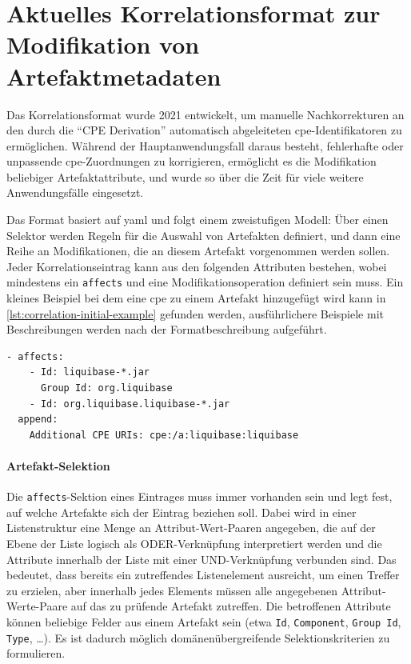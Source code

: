 \section{Aktuelles Korrelationsformat zur Modifikation von Artefaktmetadaten}\label{sec:current-correlation-format}

Das Korrelationsformat wurde 2021 entwickelt, um manuelle Nachkorrekturen an den durch die \enquote{CPE Derivation} automatisch abgeleiteten \acrshort{cpe}-Identifikatoren zu ermöglichen.
Während der Hauptanwendungsfall daraus besteht, fehlerhafte oder unpassende \acrshort{cpe}-Zuordnungen zu korrigieren, ermöglicht es die Modifikation beliebiger Artefaktattribute, und wurde so über die Zeit für viele weitere Anwendungsfälle eingesetzt.

Das Format basiert auf \acrfull{yaml} und folgt einem zweistufigen Modell:
Über einen Selektor werden Regeln für die Auswahl von Artefakten definiert, und dann eine Reihe an Modifikationen, die an diesem Artefakt vorgenommen werden sollen.
Jeder Korrelationseintrag kann aus den folgenden Attributen bestehen, wobei mindestens ein \texttt{affects} und eine Modifikationsoperation definiert sein muss.
Ein kleines Beispiel bei dem eine \acrshort{cpe} zu einem Artefakt hinzugefügt wird kann in \autoref{lst:correlation-initial-example} gefunden werden, ausführlichere Beispiele mit Beschreibungen werden nach der Formatbeschreibung aufgeführt.

\begin{lstlisting}[style=yaml,caption={Korrelationseintrag für die Java-Komponente Liquibase},label={lst:correlation-initial-example}]
- affects:
    - Id: liquibase-*.jar
      Group Id: org.liquibase
    - Id: org.liquibase.liquibase-*.jar
  append:
    Additional CPE URIs: cpe:/a:liquibase:liquibase
\end{lstlisting}

\paragraph{Artefakt-Selektion}
Die \texttt{affects}-Sektion eines Eintrages muss immer vorhanden sein und legt fest, auf welche Artefakte sich der Eintrag beziehen soll.
Dabei wird in einer Listenstruktur eine Menge an Attribut-Wert-Paaren angegeben, die auf der Ebene der Liste logisch als ODER-Verknüpfung interpretiert werden und die Attribute innerhalb der Liste mit einer UND-Verknüpfung verbunden sind.
Das bedeutet, dass bereits ein zutreffendes Listenelement ausreicht, um einen Treffer zu erzielen, aber innerhalb jedes Elements müssen alle angegebenen Attribut-Werte-Paare auf das zu prüfende Artefakt zutreffen.
Die betroffenen Attribute können beliebige Felder aus einem Artefakt sein (etwa \texttt{Id}, \texttt{Component}, \texttt{Group Id}, \texttt{Type}, \ldots).
Es ist dadurch möglich domänenübergreifende Selektionskriterien zu formulieren.

